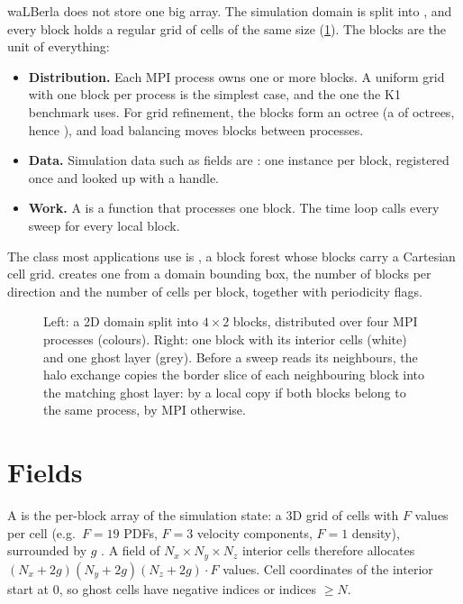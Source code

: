 waLBerla does not store one big array. The simulation domain is split into
, and every block holds a regular grid of cells of the same size
(\cref{r02:fig:blockforest}). The blocks are the unit of everything:
\begin{itemize}
  \item \textbf{Distribution.} Each MPI process owns one or more blocks. A uniform
        grid with one block per process is the simplest case, and the one the K1
        benchmark uses. For grid refinement, the blocks form an octree (a
         of octrees, hence ), and load balancing moves
        blocks between processes.
  \item \textbf{Data.} Simulation data such as fields are : one
        instance per block, registered once and looked up with a handle.
  \item \textbf{Work.} A  is a function that processes one block. The
        time loop calls every sweep for every local block.
\end{itemize}
The class most applications use is , a block forest whose
blocks carry a Cartesian cell grid. 
creates one from a domain bounding box, the number of blocks per direction and the
number of cells per block, together with periodicity flags.

\begin{figure}[htbp]
  \centering
  
  \caption[Block-structured domain, ghost layers and halo exchange]{Left: a 2D domain
    split into $4\times2$ blocks, distributed over four MPI processes (colours). Right:
    one block with its interior cells (white) and one ghost layer (grey). Before a
    sweep reads its neighbours, the halo exchange copies the border slice of each
    neighbouring block into the matching ghost layer: by a local copy if both blocks
    belong to the same process, by MPI otherwise.}
  \label{r02:fig:blockforest}
\end{figure}

\section{Fields}\label{r02:sec:fields}

A  is the per-block array of the simulation state: a 3D grid of cells with
$F$ values per cell (e.g.\ $F = 19$ PDFs, $F = 3$ velocity components, $F = 1$ density),
surrounded by $g$ . A field of $N_x\times N_y\times N_z$ interior cells
therefore allocates $(N_x+2g)(N_y+2g)(N_z+2g)\cdot F$ values. Cell coordinates of the
interior start at 0, so ghost cells have negative indices or indices $\geq N$.

